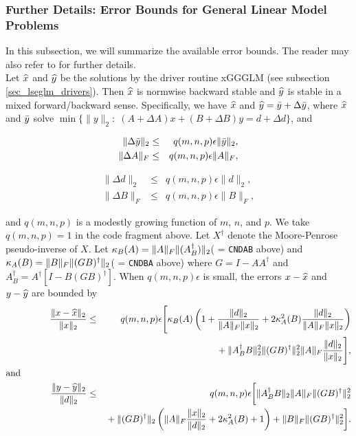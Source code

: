 \subsubsection{Further Details:  Error Bounds for General Linear Model Problems}
\label{sec_lseglm_glmdetails}

In this subsection, we will summarize the available error bounds.
The reader may also refer to \cite{lawn31,elden,paige79b}
for further details.  \\

\noindent
Let $\widehat{x}$ and $\widehat{y}$ be the solutions
by the driver routine xGGGLM (see subsection
\ref{sec_lseglm_drivers}). Then $\widehat{x}$ is normwise
backward stable and $\widehat{y}$ is stable
in a mixed forward/backward sense. Specifically,
we have $\widehat{x}$ and $\widehat{y} = \bar{y} + \Delta \bar{y}$,
where $\widehat{x}$ and $\bar{y}$ solve
  $\min\{\| y \|_2: \; (A + \Delta A)x + (B + \Delta B)y= d + \Delta d \} $,
and
\begin{center}
\parbox{2in}{
  \begin{eqnarray*}
  \| \Delta \bar{y} \|_2 & \leq & q(m,n,p)\epsilon\|\bar{y}\|_2, \\
  \| \Delta A \|_F & \leq & q(m,n,p)\epsilon\|A\|_F,
  \end{eqnarray*} }\quad
\parbox{2in}{
  \begin{eqnarray*}
  \| \Delta d \|_2 & \leq & q(m,n,p)\epsilon\|d\|_2, \\
  \| \Delta B \|_F & \leq & q(m,n,p)\epsilon\|B\|_F,
  \end{eqnarray*}
}
\end{center}
and $q(m,n,p)$ is a modestly growing function of $m$, $n$, and $p$.
We take $q(m,n,p) = 1$ in the code fragment above.
Let $X^{\dagger}$ denote the Moore-Penrose pseudo-inverse of $X$.
Let $\kappa_B(A) = \| A \|_F\| (A^\dagger_B) \|_2$( = {\tt CNDAB} above) and
    $\kappa_A(B) = \| B \|_F\| (GB)^\dagger \|_2$( = {\tt CNDBA} above)
where $G = I - AA^\dagger$ and $A^\dagger_B = A^\dagger[I-B(GB)^\dagger]$.
When $q(m,n,p) \epsilon$ is small, the errors $x-\widehat{x}$ and $y - \widehat{y}$
are bounded by
\begin{eqnarray*}
 \frac{\| x-\widehat{x} \|_2}{\| x \|_2} & \leq & q(m,n,p)\epsilon
      \Bigg[ \kappa_B(A)\left( 1 + \frac{\| d \|_2}{\| A \|_F\| x \|_2}
         + 2\kappa^2_A(B)
              \frac{\| d \|_2}{\| A \|_F\| x \|_2} \right)  \\
    &   & {}  + \| A^\dagger_BB \|_2^2
             \| (GB)^\dagger \|_2^2\| A \|_F\frac{\| d \|_2}{\| x \|_2}
       \Bigg],  \\
\mbox{and} \hspace{1in} {} & & \\
  \frac{\| y - \widehat{y} \|_2}{\| d \|_2}
    & \leq & q(m,n,p)\epsilon
         \bigg[ \| A^\dagger_BB \|_2
                    \| A \|_F\| (GB)^\dagger \|_2^2 \\
     & & {} + \| (GB)^\dagger \|_2
             \left(\| A \|_F\frac{\| x \|_2}{\| d \|_2}
             + 2\kappa^2_A(B) + 1\right)
             + \| B \|_F\| (GB)^\dagger \|_2^2 \bigg] .
\end{eqnarray*}


